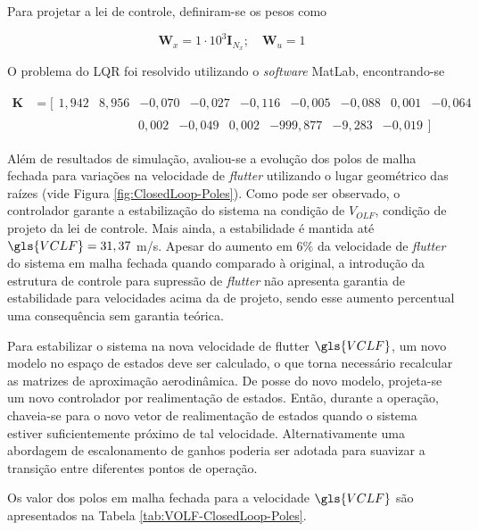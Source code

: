 Para projetar a lei de controle, definiram-se os pesos como

\[    
\boldsymbol{W}_{x} = 1\cdot10^{3}\boldsymbol{I}_{N_{x}};  \quad \boldsymbol{W}_{u} = 1
\]

O problema do \gls{LQR} foi resolvido utilizando o \textit{software} MatLab, encontrando-se

\[
\begin{split}
\boldsymbol{K} &= 
[\begin{matrix} 1,942 &  8,956 & -0,070 & -0,027 & -0,116 & -0,005 & -0,088 &  0,001 & -0,064 \end{matrix} \\
&\qquad\qquad\qquad\qquad \begin{matrix} 0,002 & -0,049 &  0,002 & -999,877 & -9,283 & -0,019 \end{matrix}]
\end{split}
\]

Além de resultados de simulação, avaliou-se a evolução dos polos de malha fechada para variações na velocidade de \textit{flutter} utilizando o lugar geométrico das raízes (vide Figura \ref{fig:ClosedLoop-Poles}). Como pode ser observado, o controlador garante a estabilização do sistema na condição de $V_{OLF}$, condição de projeto da lei de controle. Mais ainda, a estabilidade é mantida até $\gls{VCLF}=31,37$ m/s. Apesar do aumento em $6 \%$ da velocidade de \textit{flutter} do sistema em malha fechada quando comparado à original, a introdução da estrutura de controle para supressão de \textit{flutter} não apresenta garantia de estabilidade para velocidades acima da de projeto, sendo esse aumento percentual uma consequência sem garantia teórica.

Para estabilizar o sistema na nova velocidade de flutter $\gls{VCLF}$, um novo modelo no espaço de estados deve ser calculado, o que torna necessário recalcular as matrizes de aproximação aerodinâmica. De posse do novo modelo, projeta-se um novo controlador por realimentação de estados. Então, durante a operação,  chaveia-se para o novo vetor de realimentação de estados quando o sistema estiver suficientemente próximo de tal velocidade. Alternativamente uma abordagem de escalonamento de ganhos poderia ser adotada para suavizar a transição entre diferentes pontos de operação.

Os valor dos polos em malha fechada para a velocidade $\gls{VCLF}$ são apresentados na Tabela \ref{tab:VOLF-ClosedLoop-Poles}.

